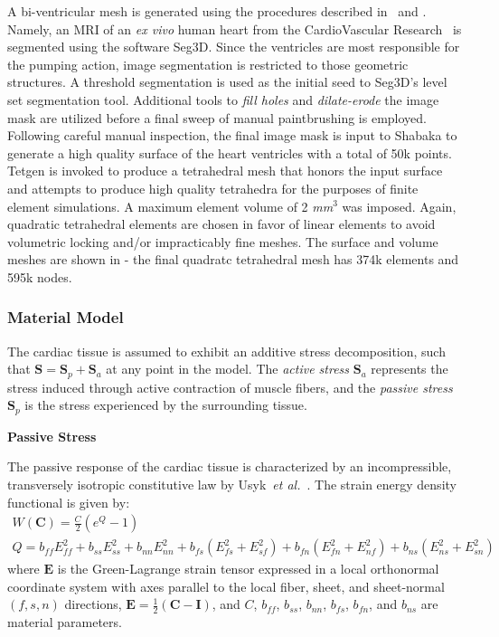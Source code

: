 A bi-ventricular mesh is generated using the procedures described in~ and . Namely, an MRI of an \textit{ex vivo} human heart from the CardioVascular Research~\cite{cvgg} is segmented using the software Seg3D. Since the ventricles are most responsible for the pumping action, image segmentation is restricted to those geometric structures. A threshold segmentation is used as the initial seed to Seg3D's level set segmentation tool. Additional tools to \textit{fill holes} and \textit{dilate-erode} the image mask are utilized before a final sweep of manual paintbrushing is employed. Following careful manual inspection, the final image mask is input to Shabaka to generate a high quality surface of the heart ventricles with a total of 50k points. Tetgen is invoked to produce a tetrahedral mesh that honors the input surface and attempts to produce high quality tetrahedra for the purposes of finite element simulations. A maximum element volume of 2 \textit{mm$^3$} was imposed. Again, quadratic tetrahedral elements are chosen in favor of linear elements to avoid volumetric locking and/or impracticably fine meshes. The surface and volume meshes are shown in  - the final quadratc tetrahedral mesh has 374k elements and 595k nodes.

\subsubsection{Material Model}
\label{Material Model}

The cardiac tissue is assumed to exhibit an additive stress decomposition, such that $\bm{S} = \bm{S}_p + \bm{S}_a$ at any point in the model. The \textit{active stress} $\bm{S}_a$ represents the stress induced through active contraction of muscle fibers, and the \textit{passive stress} $\bm{S}_p$ is the stress experienced by the surrounding tissue.

\textbf{Passive Stress}

The passive response of the cardiac tissue is characterized by an incompressible, transversely isotropic constitutive law by Usyk~\textit{et al.}~\cite{usyk_2002}. The strain energy density functional is given by:
\begin{gather}
W(\bm{C}) = \frac{C}{2}\left(e^Q -1\right) \\
Q = b_{ff} E^2_{ff} + b_{ss} E^2_{ss} + b_{nn} E^2_{nn} + b_{fs}\left(E^2_{fs} + E^2_{sf}\right) + b_{fn}\left(E^2_{fn} + E^2_{nf}\right) + b_{ns}\left(E^2_{ns} + E^2_{sn}\right)
\label{eqn:usyk}
\end{gather}
where $\bm{E}$ is the Green-Lagrange strain tensor expressed in a local orthonormal coordinate system with axes parallel to the local fiber, sheet, and sheet-normal $(f,s,n)$ directions, $\bm{E} = \frac{1}{2}(\bm{C} - \bm{I})$, and $C$, $b_{ff}$, $b_{ss}$, $b_{nn}$, $b_{fs}$, $b_{fn}$, and $b_{ns}$ are material parameters.

